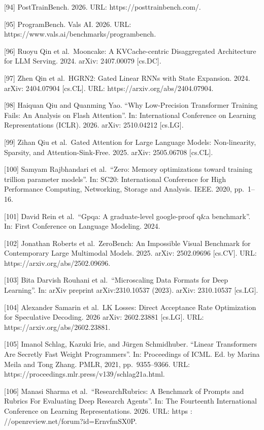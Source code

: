 \documentclass[
  10
]{article}
\begin{document}
{[}94{]} PostTrainBench. 2026. URL: https://posttrainbench.com/.

{[}95{]} ProgramBench. Vals AI. 2026. URL:
https://www.vals.ai/benchmarks/programbench.

{[}96{]} Ruoyu Qin et al.~Mooncake: A KVCache-centric Disaggregated
Architecture for LLM Serving. 2024. arXiv: 2407.00079 {[}cs.DC{]}.

{[}97{]} Zhen Qin et al.~HGRN2: Gated Linear RNNs with State Expansion.
2024. arXiv: 2404.07904 {[}cs.CL{]}. URL:
https://arxiv.org/abs/2404.07904.

{[}98{]} Haiquan Qiu and Quanming Yao. ``Why Low-Precision Transformer
Training Fails: An Analysis on Flash Attention''. In: International
Conference on Learning Representations (ICLR). 2026. arXiv: 2510.04212
{[}cs.LG{]}.

{[}99{]} Zihan Qiu et al.~Gated Attention for Large Language Models:
Non-linearity, Sparsity, and Attention-Sink-Free. 2025. arXiv:
2505.06708 {[}cs.CL{]}.

{[}100{]} Samyam Rajbhandari et al.~``Zero: Memory optimizations toward
training trillion parameter models''. In: SC20: International Conference
for High Performance Computing, Networking, Storage and Analysis. IEEE.
2020, pp.~1--16.

{[}101{]} David Rein et al.~``Gpqa: A graduate-level google-proof q\&a
benchmark''. In: First Conference on Language Modeling. 2024.

{[}102{]} Jonathan Roberts et al.~ZeroBench: An Impossible Visual
Benchmark for Contemporary Large Multimodal Models. 2025. arXiv:
2502.09696 {[}cs.CV{]}. URL: https://arxiv.org/abs/2502.09696.

{[}103{]} Bita Darvish Rouhani et al.~``Microscaling Data Formats for
Deep Learning''. In: arXiv preprint arXiv:2310.10537 (2023). arXiv:
2310.10537 {[}cs.LG{]}.

{[}104{]} Alexander Samarin et al.~LK Losses: Direct Acceptance Rate
Optimization for Speculative Decoding. 2026 arXiv: 2602.23881
{[}cs.LG{]}. URL: https://arxiv.org/abs/2602.23881.

{[}105{]} Imanol Schlag, Kazuki Irie, and Jürgen Schmidhuber. ``Linear
Transformers Are Secretly Fast Weight Programmers''. In: Proceedings of
ICML. Ed. by Marina Meila and Tong Zhang. PMLR, 2021, pp.~9355--9366.
URL: https://proceedings.mlr.press/v139/schlag21a.html.

{[}106{]} Manasi Sharma et al.~``ResearchRubrics: A Benchmark of Prompts
and Rubrics For Evaluating Deep Research Agents''. In: The Fourteenth
International Conference on Learning Representations. 2026. URL: https :
//openreview.net/forum?id=ErnvfmSX0P.
\end{document}
